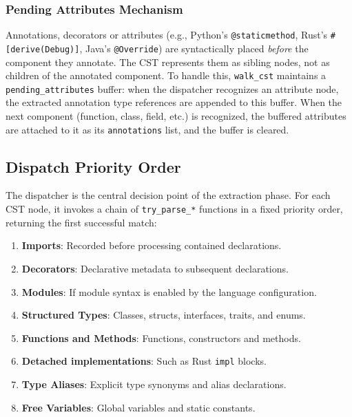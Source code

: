 \subsubsection{Pending Attributes Mechanism}

Annotations, decorators or attributes (e.g., Python's
  \texttt{@static}\-\texttt{method},
Rust's \texttt{\#[derive(Debug)]}, Java's \texttt{@Override}) are
syntactically placed \textit{before} the component they annotate. The
CST represents them as sibling nodes, not as children of the
annotated component. To handle this, \texttt{walk\_cst} maintains a
\texttt{pending\_attributes} buffer: when the dispatcher recognizes
an attribute node, the extracted annotation type references are
appended to this buffer. When the next component (function, class,
field, etc.) is recognized, the buffered attributes are attached to
it as its \texttt{annotations} list, and the buffer is cleared.

\subsection{Dispatch Priority Order}
\label{sec:dispatcher}

The dispatcher is the central decision point of the extraction phase.
For each CST node, it invokes a chain of \texttt{try\_parse\_*}
functions in a fixed priority order, returning the first successful match:

\begin{enumerate}
  \item \textbf{Imports}: Recorded before processing contained
    declarations.
  \item \textbf{Decorators}: Declarative
    metadata to subsequent declarations.
  \item \textbf{Modules}: If module syntax is enabled by the language
    configuration.
  \item \textbf{Structured Types}: Classes, structs, interfaces,
    traits, and enums.
  \item \textbf{Functions and Methods}: Functions, constructors and methods.
  \item \textbf{Detached implementations}: Such as Rust \texttt{impl} blocks.
  \item \textbf{Type Aliases}: Explicit type synonyms and alias declarations.
  \item \textbf{Free Variables}: Global variables and static
    constants.
\end{enumerate}


